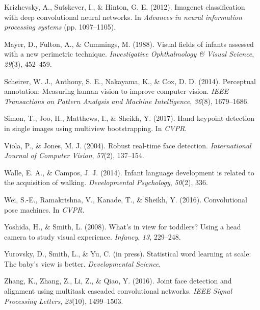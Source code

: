 \documentclass[10pt, letterpaper]{article}
\begin{document}
\hypertarget{ref-krizhevsky2012imagenet}{}
Krizhevsky, A., Sutskever, I., \& Hinton, G. E. (2012). Imagenet
classification with deep convolutional neural networks. In
\emph{Advances in neural information processing systems} (pp.
1097--1105).

\hypertarget{ref-mayer1988}{}
Mayer, D., Fulton, A., \& Cummings, M. (1988). Visual fields of infants
assessed with a new perimetric technique. \emph{Investigative
Ophthalmology \& Visual Science}, \emph{29}(3), 452--459.

\hypertarget{ref-scheirer2014perceptual}{}
Scheirer, W. J., Anthony, S. E., Nakayama, K., \& Cox, D. D. (2014).
Perceptual annotation: Measuring human vision to improve computer
vision. \emph{IEEE Transactions on Pattern Analysis and Machine
Intelligence}, \emph{36}(8), 1679--1686.

\hypertarget{ref-simon2017hand}{}
Simon, T., Joo, H., Matthews, I., \& Sheikh, Y. (2017). Hand keypoint
detection in single images using multiview bootstrapping. In
\emph{CVPR}.

\hypertarget{ref-viola2004robust}{}
Viola, P., \& Jones, M. J. (2004). Robust real-time face detection.
\emph{International Journal of Computer Vision}, \emph{57}(2), 137--154.

\hypertarget{ref-walle2014}{}
Walle, E. A., \& Campos, J. J. (2014). Infant language development is
related to the acquisition of walking. \emph{Developmental Psychology},
\emph{50}(2), 336.

\hypertarget{ref-wei2016cpm}{}
Wei, S.-E., Ramakrishna, V., Kanade, T., \& Sheikh, Y. (2016).
Convolutional pose machines. In \emph{CVPR}.

\hypertarget{ref-yoshida2008}{}
Yoshida, H., \& Smith, L. (2008). What's in view for toddlers? Using a
head camera to study visual experience. \emph{Infancy}, \emph{13},
229--248.

\hypertarget{ref-yurovsky2012}{}
Yurovsky, D., Smith, L., \& Yu, C. (in press). Statistical word learning
at scale: The baby's view is better. \emph{Developmental Science}.

\hypertarget{ref-zhang2016}{}
Zhang, K., Zhang, Z., Li, Z., \& Qiao, Y. (2016). Joint face detection
and alignment using multitask cascaded convolutional networks.
\emph{IEEE Signal Processing Letters}, \emph{23}(10), 1499--1503.
\end{document}
